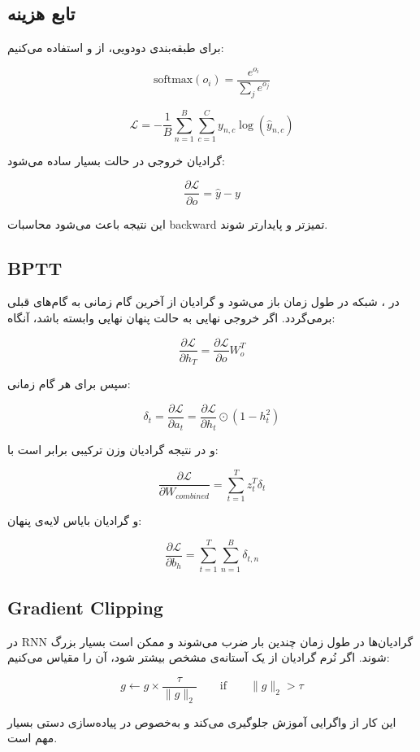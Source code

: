 \documentclass[12pt,a4paper]{article}
\begin{document}
\subsection{تابع هزینه}

برای طبقه‌بندی دودویی، از  و  استفاده می‌کنیم:

\[
\text{softmax}(o_i)=\frac{e^{o_i}}{\sum_j e^{o_j}}
\]

\[
\mathcal{L}
=
-\frac{1}{B}
\sum_{n=1}^{B}
\sum_{c=1}^{C}
y_{n,c}\log(\hat{y}_{n,c})
\]

گرادیان خروجی در حالت  بسیار ساده می‌شود:

\[
\frac{\partial \mathcal{L}}{\partial o}
=
\hat{y}-y
\]

این نتیجه باعث می‌شود محاسبات backward تمیزتر و پایدارتر شوند.

\subsection{BPTT}

در ، شبکه در طول زمان باز می‌شود و گرادیان از
آخرین گام زمانی به گام‌های قبلی برمی‌گردد. اگر خروجی نهایی به حالت پنهان
نهایی وابسته باشد، آنگاه:

\[
\frac{\partial \mathcal{L}}{\partial h_T}
=
\frac{\partial \mathcal{L}}{\partial o} W_o^T
\]

سپس برای هر گام زمانی:

\[
\delta_t
=
\frac{\partial \mathcal{L}}{\partial a_t}
=
\frac{\partial \mathcal{L}}{\partial h_t}
\odot
(1-h_t^2)
\]

و در نتیجه گرادیان وزن ترکیبی برابر است با:

\[
\frac{\partial \mathcal{L}}{\partial W_{combined}}
=
\sum_{t=1}^{T} z_t^T \delta_t
\]

و گرادیان بایاس لایه‌ی پنهان:

\[
\frac{\partial \mathcal{L}}{\partial b_h}
=
\sum_{t=1}^{T} \sum_{n=1}^{B} \delta_{t,n}
\]

\subsection{Gradient Clipping}

\begin{tcolorbox}[
colback=softorange,
colframe=golden,
title={کنترل Exploding Gradient},
fonttitle=\bfseries
]

در RNN گرادیان‌ها در طول زمان چندین بار ضرب می‌شوند و ممکن است بسیار بزرگ شوند.
اگر نُرم گرادیان از یک آستانه‌ی مشخص بیشتر شود، آن را مقیاس می‌کنیم:

\[
g \leftarrow g \times \frac{\tau}{\|g\|_2}
\qquad \text{if} \qquad \|g\|_2 > \tau
\]

این کار از واگرایی آموزش جلوگیری می‌کند و به‌خصوص در پیاده‌سازی دستی بسیار مهم است.
\end{tcolorbox}
\end{document}
